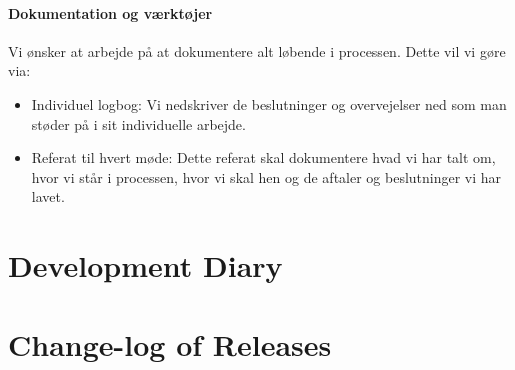 \documentclass[11pt]{article}
\begin{document}
\paragraph{Dokumentation og værktøjer}
Vi ønsker at arbejde på at dokumentere alt løbende i processen. Dette vil vi gøre via:
\begin{itemize}
    \item Individuel logbog: Vi nedskriver de beslutninger og overvejelser ned som man støder på i sit individuelle arbejde.
    \item Referat til hvert møde: Dette referat skal dokumentere hvad vi har talt om, hvor vi står i processen, hvor vi skal hen og de aftaler og beslutninger vi har lavet.
\end{itemize}

\section{Development Diary}

\section{Change-log of Releases}
\end{document}
